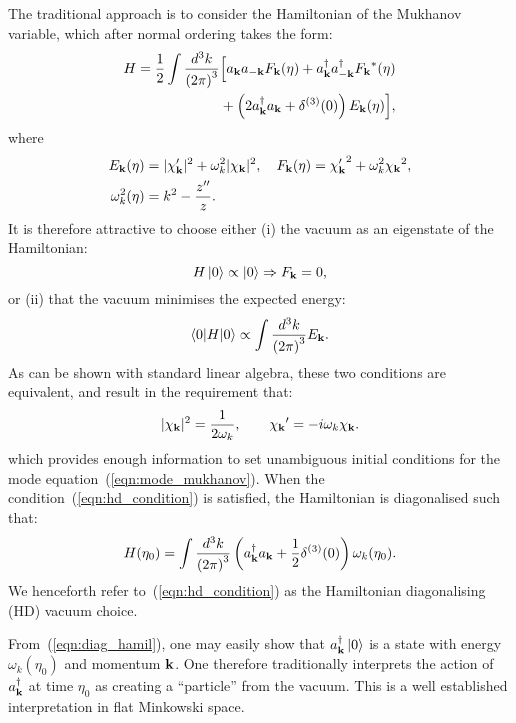 The traditional approach is to consider the Hamiltonian of the Mukhanov variable, which after normal ordering takes the form:
\begin{align}
  H = \frac{1}{2}\int\frac{d^3k}{{(2\pi)}^3} 
  &\Big[ a_{\mathbf{k}} a_{-\mathbf{k}} F_{\mathbf{k}}(\eta) + a_{\mathbf{k}}^\dagger a_{-\mathbf{k}}^\dagger {F_{\mathbf{k}}}^\ast(\eta) \nonumber \\
  &+ \left(2a_{\mathbf{k}}^\dagger a_{\mathbf{k}} + \delta^{(3)}(0)\right)E_{\mathbf{k}}(\eta) \Big], 
\end{align}
where
\begin{align}
  E_{\mathbf{k}}(\eta) &= |\chi_{\mathbf{k}}^\prime|^2 + \omega_k^2|\chi_{\mathbf{k}}|^2,\quad
  F_{\mathbf{k}}(\eta) = {\chi_{\mathbf{k}}^\prime}^2 + \omega_k^2{\chi_{\mathbf{k}}}^2,\\
  \omega_k^2(\eta) &= k^2-\frac{{{z}^{\prime\prime}}}{z}.
  \label{eqn:def_omega}
\end{align}
It is therefore attractive to choose either (i) the vacuum as an eigenstate of the Hamiltonian:
\begin{equation}
  H\left|0\right\rangle\propto\left|0\right\rangle \Rightarrow F_{\mathbf{k}}=0,
  \label{eqn:eigenstate}
\end{equation}
or (ii) that the vacuum minimises the expected energy:
\begin{equation}
  \left\langle0\middle|H\middle|0\right\rangle \propto \int \frac{d^3k}{{(2\pi)}^3} E_{\mathbf{k}}.
  \label{eqn:hamil}
\end{equation}
As can be shown with standard linear algebra, these two conditions are equivalent, and result in the requirement that:
\begin{equation}
  |\chi_{\mathbf{k}}|^2 = \frac{1}{2\omega_k}, \qquad {{\chi_{\mathbf{k}}}^\prime} = -i \omega_k \chi_{\mathbf{k}}.
  \label{eqn:hd_condition}
\end{equation}
which provides enough information to set unambiguous initial conditions for the mode equation~(\ref{eqn:mode_mukhanov}).
When the condition~(\ref{eqn:hd_condition}) is satisfied, the Hamiltonian is diagonalised such that:
\begin{equation}
  H(\eta_0) = \int\frac{d^3k}{{(2\pi)}^3} 
  \left(a_{\mathbf{k}}^\dagger a_{\mathbf{k}} + \frac{1}{2}\delta^{(3)}(0)\right)\omega_k(\eta_0). 
  \label{eqn:diag_hamil}
\end{equation}
We henceforth refer to~(\ref{eqn:hd_condition}) as the Hamiltonian diagonalising (HD) vacuum choice.

From~(\ref{eqn:diag_hamil}), one may easily show that $a_{\mathbf{k}}^\dagger\left|0\right\rangle$ is a state with energy $\omega_k(\eta_0)$ and momentum $\mathbf{k}$. One therefore traditionally interprets the action of $a_{\mathbf{k}}^\dagger$ at time $\eta_0$ as creating a ``particle'' from the vacuum. This is a well established interpretation in flat Minkowski space. %


